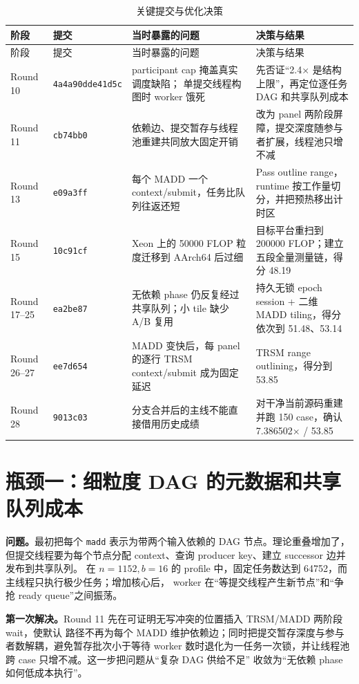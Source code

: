 \documentclass[UTF8,a4paper,openany,11pt,fontset=fandol]{ctexrep}
\begin{document}
{\small
\begin{longtable}{L{1.8cm}L{2.2cm}L{4.5cm}L{5.5cm}}
  \caption{关键提交与优化决策}\label{tab:git-path}\\
  \toprule
  阶段 & 提交 & 当时暴露的问题 & 决策与结果 \\
  \midrule
  \endfirsthead
  \toprule
  阶段 & 提交 & 当时暴露的问题 & 决策与结果 \\
  \midrule
  \endhead
  Round 10 & \texttt{4a4a90d}\newline\texttt{de41d5c} & participant cap 掩盖真实调度缺陷；
  单提交线程构图时 worker 饿死 & 先否证“2.4× 是结构上限”，再定位逐任务 DAG 和共享队列成本 \\
  Round 11 & \texttt{cb74bb0} & 依赖边、提交暂存与线程池重建共同放大固定开销 &
  改为 panel 两阶段屏障，提交深度随参与者扩展，线程池只增不减 \\
  Round 13 & \texttt{e09a3ff} & 每个 MADD 一个 context/submit，任务比队列往返还短 &
  Pass outline range，runtime 按工作量切分，并把预热移出计时区 \\
  Round 15 & \texttt{10c91cf} & Xeon 上的 50000 FLOP 粒度迁移到 AArch64 后过细 &
  目标平台重扫到 200000 FLOP；建立五段全量测量链，得分 48.19 \\
  Round 17--25 & \texttt{ea2be87} & 无依赖 phase 仍反复经过共享队列；小 tile 缺少 A/B 复用 &
  持久无锁 epoch session + 二维 MADD tiling，得分依次到 51.48、53.14 \\
  Round 26--27 & \texttt{ee7d654} & MADD 变快后，每 panel 的逐行 TRSM context/submit 成为固定延迟 &
  TRSM range outlining，得分到 53.85 \\
  Round 28 & \texttt{9013c03} & 分支合并后的主线不能直接借用历史成绩 &
  对干净当前源码重建并跑 150 case，确认 7.386502× / 53.85 \\
  \bottomrule
\end{longtable}
}

\section{瓶颈一：细粒度 DAG 的元数据和共享队列成本}

\textbf{问题。}最初把每个 \texttt{madd} 表示为带两个输入依赖的 DAG 节点。理论重叠增加了，
但提交线程要为每个节点分配 context、查询 producer key、建立 successor 边并发布到共享队列。
在 \(n=1152,b=16\) 的 profile 中，固定任务数达到 64752，而主线程只执行极少任务；增加核心后，
worker 在“等提交线程产生新节点”和“争抢 ready queue”之间振荡。

\textbf{第一次解决。}Round 11 先在可证明无写冲突的位置插入 TRSM/MADD 两阶段 wait，使默认
路径不再为每个 MADD 维护依赖边；同时把提交暂存深度与参与者数解耦，避免暂存批次小于等待
worker 数时退化为一任务一次锁，并让线程池跨 case 只增不减。这一步把问题从“复杂 DAG 供给不足”
收敛为“无依赖 phase 如何低成本执行”。
\end{document}
